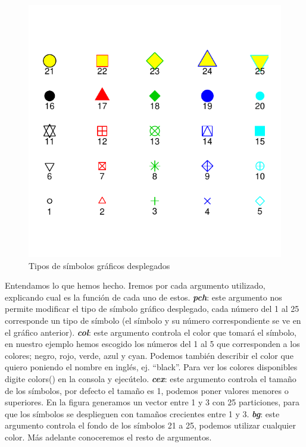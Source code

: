 \documentclass[]{article}
\begin{document}
\begin{figure}

{\centering \includegraphics{index_files/figure-latex/unnamed-chunk-7-1} 

}

\caption{Tipos de símbolos gráficos desplegados}\label{fig:unnamed-chunk-7}
\end{figure}

Entendamos lo que hemos hecho. Iremos por cada argumento utilizado,
explicando cual es la función de cada uno de estos. \emph{\textbf{pch}}:
este argumento nos permite modificar el tipo de símbolo gráfico
desplegado, cada número del 1 al 25 corresponde un tipo de símbolo (el
símbolo y su número correspondiente se ve en el gráfico anterior).
\emph{\textbf{col}}: este argumento controla el color que tomará el
símbolo, en nuestro ejemplo hemos escogido los números del 1 al 5 que
corresponden a los colores; negro, rojo, verde, azul y cyan. Podemos
también describir el color que quiero poniendo el nombre en inglés, ej.
``black''. Para ver los colores disponibles digite colors() en la
consola y ejecútelo. \emph{\textbf{cex}}: este argumento controla el
tamaño de los símbolos, por defecto el tamaño es 1, podemos poner
valores menores o superiores. En la figura generamos un vector entre 1 y
3 con 25 particiones, para que los símbolos se desplieguen con tamaños
crecientes entre 1 y 3. \emph{\textbf{bg}}: este argumento controla el
fondo de los símbolos 21 a 25, podemos utilizar cualquier color. Más
adelante conoceremos el resto de argumentos.
\end{document}
